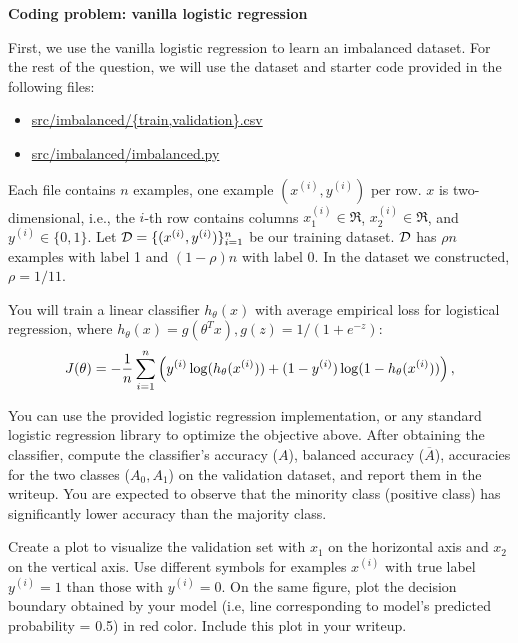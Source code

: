 \item {} \textbf{Coding problem: vanilla logistic regression}

First, we use the vanilla logistic regression to learn an imbalanced dataset. For the rest of the question, we will use the dataset and starter code provided in
the following files:
%
\begin{center}
	\begin{itemize}
		\item	\url{src/imbalanced/{train,validation}.csv}
		\item   \url{src/imbalanced/imbalanced.py}
	\end{itemize}
\end{center}


Each file contains $n$ examples, one example $(x^{(i)}, y^{(i)})$ per row. $x$ is two-dimensional, i.e., the $i$-th row contains columns $x^{(i)}_1\in\Re$,
$x^{(i)}_2\in\Re$, and $y^{(i)}\in\{0, 1\}$. Let $\mathcal{D}=\{(x^{(i)}, y^{(i)})\}_{i=1}^n$ be our training dataset. $\mathcal{D}$ has $\rho n$ examples with label 1 and $(1-\rho)n$ with label 0. In the dataset we constructed, $\rho=1/11$.

You will train a linear classifier $h_{\theta}(x)$ with average empirical loss for logistical regression, where $h_\theta(x)=g(\theta^T x), g(z)=1/(1+e^{-z})$:
\begin{align*}
J(\theta) = -\frac{1}{{n}} \sum_{i=1}^{n} \left(y^{(i)}\log(h_{\theta}(x^{(i)}))
+  (1 - y^{(i)})\log(1 - h_{\theta}(x^{(i)}))\right), 
\end{align*}

You can use the provided logistic regression implementation, or any standard logistic regression library to optimize the objective above. After obtaining the classifier, 
compute the classifier's accuracy ($A$), balanced accuracy ($\overline{A}$), accuracies for the two classes ($A_0, A_1$) on the validation dataset, and report them in the writeup. You are expected to observe that the minority class (positive class) has significantly lower accuracy than the majority class. 


Create a plot to visualize the validation set with $x_1$ on the horizontal axis and $x_2$ on
the vertical axis. Use different symbols for examples $x^{(i)}$ with true label $y^{(i)} = 1$
than those with $y^{(i)} = 0$. On the same figure, plot the decision boundary obtained
by your model (i.e, line corresponding to model's predicted probability = 0.5) in red color. Include
this plot in your writeup.
